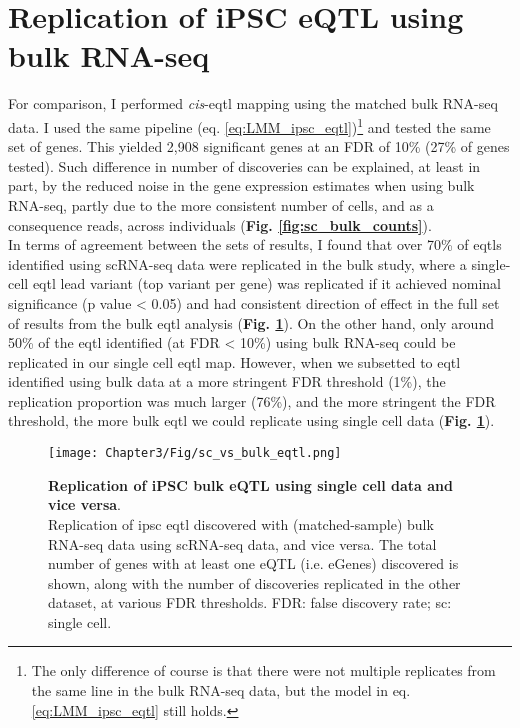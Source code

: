 \newpage

\section{Replication of iPSC eQTL using bulk RNA-seq}

For comparison, I performed \textit{cis}-\gls{eqtl} mapping using the matched bulk RNA-seq data.
I used the same pipeline (eq. \eqref{eq:LMM_ipsc_eqtl})\footnote{The only difference of course is that there were not multiple replicates from the same line in the bulk RNA-seq data, but the model in eq. \eqref{eq:LMM_ipsc_eqtl} still holds.} and tested the same set of genes. 
This yielded 2,908 significant genes at an FDR of 10\% (27\% of genes tested).
Such difference in number of discoveries can be explained, at least in part, by the reduced noise in the gene expression estimates when using bulk RNA-seq, partly due to the more consistent number of cells, and as a consequence reads, across individuals (\textbf{Fig. \ref{fig:sc_bulk_counts}}). \\

In terms of agreement between the sets of results, I found that over 70\% of \glspl{eqtl} identified using scRNA-seq data were replicated in the bulk study, where a single-cell \gls{eqtl} lead variant (top variant per gene) was replicated if it achieved nominal significance (p value < 0.05) and had consistent direction of effect in the full set of results from the bulk \gls{eqtl} analysis (\textbf{Fig. \ref{fig:sc_bulk_egenes}}). 
On the other hand, only around 50\% of the \gls{eqtl} identified (at FDR < 10\%) using bulk RNA-seq could be replicated in our single cell \gls{eqtl} map.
However, when we subsetted to \gls{eqtl} identified using bulk data at a more stringent FDR threshold (1\%), the replication proportion was much larger (76\%), and the more stringent the FDR threshold, the more bulk \gls{eqtl} we could replicate using single cell data (\textbf{Fig. \ref{fig:sc_bulk_egenes}}).

\begin{figure}[h]
\centering
\texttt{[image: Chapter3/Fig/sc\_vs\_bulk\_eqtl.png]}
\caption[iPSC eQTL (bulk vs sc)]{\textbf{Replication of iPSC bulk eQTL using single cell data and vice versa}.\\
Replication of \gls{ipsc} \gls{eqtl} discovered with (matched-sample) bulk RNA-seq data using scRNA-seq data, and vice versa.
The total number of genes with at least one eQTL (i.e. eGenes) discovered is shown, along with the number of discoveries replicated in the other dataset, at various FDR thresholds. 
FDR: false discovery rate; sc: single cell.}
\label{fig:sc_bulk_egenes}
\end{figure}

